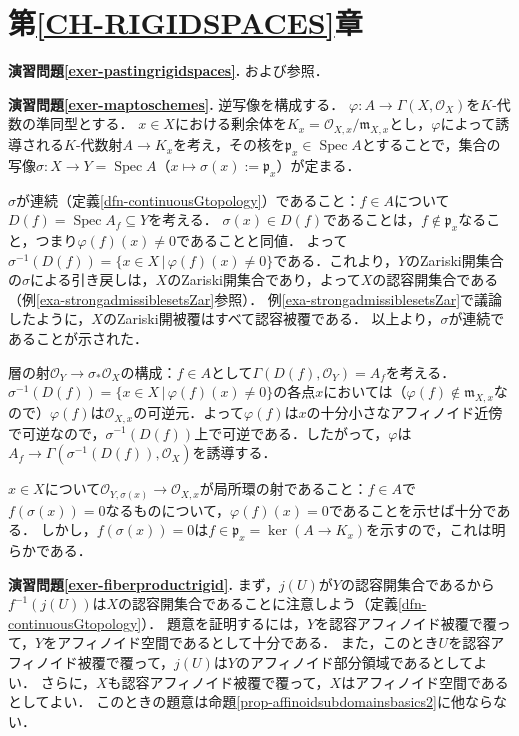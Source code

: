 \documentclass[a4paper,12pt, dvipdfmx]{jsbook}
\def\O{\mathscr{O}}
\def\m{\mathfrak{m}}
\def\Spec{\mathop{\mathrm{Spec}}\nolimits}
\def\ker{\mathop{\mathrm{ker}}\nolimits}
\theoremstyle{plain}
\theoremstyle{definition}
\begin{document}
{\section*{第\ref{CH-RIGIDSPACES}章}

\noindent
{\bf 演習問題\ref{exer-pastingrigidspaces}.}
\cite[\S9.3.2, Prop.\ 1]{BGR}および\cite[\S9.3.3, Prop.\ 1]{BGR}参照．

\medskip\noindent
{\bf 演習問題\ref{exer-maptoschemes}.}
逆写像を構成する．
$\varphi\colon A\rightarrow\Gamma(X,\O_X)$を$K$-代数の準同型とする．
$x\in X$における剰余体を$K_x=\O_{X,x}/\m_{X,x}$とし，$\varphi$によって誘導される$K$-代数射$A\rightarrow K_x$を考え，その核を$\mathfrak{p}_x\in\Spec A$とすることで，集合の写像$\sigma\colon X\rightarrow Y=\Spec A$（$x\mapsto\sigma(x):=\mathfrak{p}_x$）が定まる．

$\sigma$が連続（定義\ref{dfn-continuousGtopology}）であること：$f\in A$について$D(f)=\Spec A_f\subseteq Y$を考える．
$\sigma(x)\in D(f)$であることは，$f\not\in\mathfrak{p}_x$なること，つまり$\varphi(f)(x)\neq 0$であることと同値．
よって$\sigma^{-1}(D(f))=\{x\in X\,|\,\varphi(f)(x)\neq 0\}$である．これより，$Y$のZariski開集合の$\sigma$による引き戻しは，$X$のZariski開集合であり，よって$X$の認容開集合である（例\ref{exa-strongadmissiblesetsZar}参照）．
例\ref{exa-strongadmissiblesetsZar}で議論したように，$X$のZariski開被覆はすべて認容被覆である．
以上より，$\sigma$が連続であることが示された．

層の射$\O_Y\rightarrow\sigma_{\ast}\O_X$の構成：$f\in A$として$\Gamma(D(f),\O_Y)=A_f$を考える．
$\sigma^{-1}(D(f))=\{x\in X\,|\,\varphi(f)(x)\neq 0\}$の各点$x$においては（$\varphi(f)\not\in\m_{X,x}$なので）$\varphi(f)$は$\O_{X,x}$の可逆元．よって$\varphi(f)$は$x$の十分小さなアフィノイド近傍で可逆なので，$\sigma^{-1}(D(f))$上で可逆である．したがって，$\varphi$は$A_f\rightarrow\Gamma(\sigma^{-1}(D(f)),\O_X)$を誘導する．

$x\in X$について$\O_{Y,\sigma(x)}\rightarrow\O_{X,x}$が局所環の射であること：$f\in A$で$f(\sigma(x))=0$なるものについて，$\varphi(f)(x)=0$であることを示せば十分である．
しかし，$f(\sigma(x))=0$は$f\in\mathfrak{p}_x=\ker(A\rightarrow K_x)$を示すので，これは明らかである．

\medskip\noindent
{\bf 演習問題\ref{exer-fiberproductrigid}.}
まず，$j(U)$が$Y$の認容開集合であるから$f^{-1}(j(U))$は$X$の認容開集合であることに注意しよう（定義\ref{dfn-continuousGtopology}）．
題意を証明するには，$Y$を認容アフィノイド被覆で覆って，$Y$をアフィノイド空間であるとして十分である．
また，このとき$U$を認容アフィノイド被覆で覆って，$j(U)$は$Y$のアフィノイド部分領域であるとしてよい．
さらに，$X$も認容アフィノイド被覆で覆って，$X$はアフィノイド空間であるとしてよい．
このときの題意は命題\ref{prop-affinoidsubdomainsbasics2}に他ならない．

}
\end{document}

